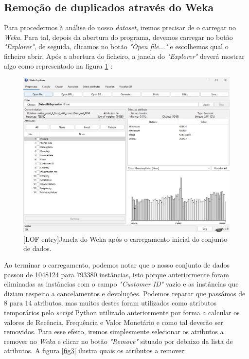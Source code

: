 \documentclass{easychair}
\begin{document}

\subsection{Remoção de duplicados através do Weka}

Para procedermos à análise do nosso \textit{dataset}, iremos precisar de o carregar no \textit{Weka}. Para tal, depois da abertura do programa, devemos carregar no botão \textit{"Explorer"}, de seguida, clicamos no botão \textit{"Open file..."} e escolhemos qual o ficheiro abrir. Após a abertura do ficheiro, a janela do \textit{"Explorer"} deverá mostrar algo como representado na figura \ref{fig2} :

\begin{figure}[H]
    \begin{centering}
    \includegraphics[width=1\linewidth]{imagens/figure2.jpg}\label{cap-2-fig2}
    [LOF entry]{Janela do Weka após o carregamento inicial do conjunto de dados.}
    \label{fig2}
    \end{centering}
\end{figure}

\vspace{-0.3cm}
Ao terminar o carregamento, podemos notar que o nosso conjunto de dados passou de 1048124 para 793380 instâncias, isto porque anteriormente foram eliminadas as instâncias com o campo \textit{"Customer ID"} vazio e as instâncias que diziam respeito a cancelamentos e devoluções. Podemos reparar que passámos de 8 para 14 atributos, mas muitos destes foram utilizados como atributos temporários pelo \textit{script} Python utilizado anteriormente por forma a calcular os valores de Recência, Frequência e Valor Monetário e como tal deverão ser removidos. Para esse efeito, iremos simplesmente selecionar os atributos a remover no \textit{Weka} e clicar no botão \textit{"Remove"} situado por debaixo da lista de atributos. A figura \ref{fig3} ilustra quais os atributos a remover:
\end{document}
